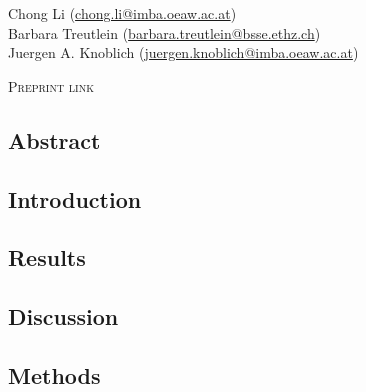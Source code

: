 \noindent
Chong Li (\href{mailto:chong.li@imba.oeaw.ac.at}{chong.li@imba.oeaw.ac.at})\\
Barbara Treutlein (\href{mailto:barbara.treutlein@bsse.ethz.ch}{barbara.treutlein@bsse.ethz.ch})\\
Juergen A. Knoblich (\href{mailto:juergen.knoblich@imba.oeaw.ac.at}{juergen.knoblich@imba.oeaw.ac.at})

\vspace{1cm}

\noindent
{\large\textsc{Preprint link}} 




\subsection{Abstract}
\subsection{Introduction}
\subsection{Results}
\subsection{Discussion}
\subsection{Methods}

